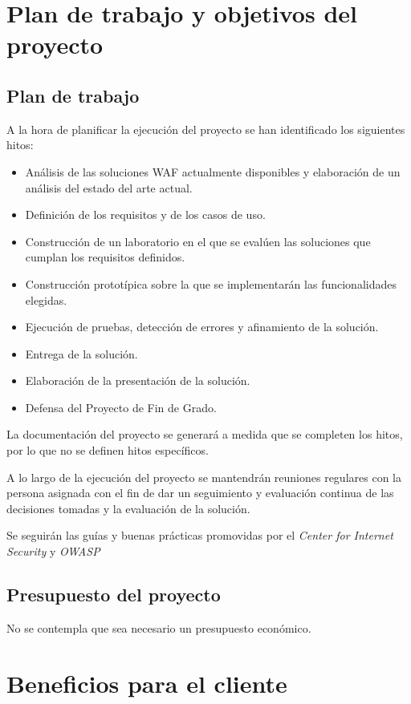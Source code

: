 \section{Plan de trabajo y objetivos del proyecto}
\subsection{Plan de trabajo}
\par A la hora de planificar la ejecución del proyecto se han identificado los siguientes hitos:
\begin{itemize}
  \item Análisis de las soluciones WAF actualmente disponibles y elaboración de un análisis del estado del arte actual.
  \item Definición de los requisitos y de los casos de uso.
  \item Construcción de un laboratorio en el que se evalúen las soluciones que cumplan los requisitos definidos.
  \item Construcción prototípica sobre la que se implementarán las funcionalidades elegidas.
  \item Ejecución de pruebas, detección de errores y afinamiento de la solución.
  \item Entrega de la solución.
  \item Elaboración de la presentación de la solución.
  \item Defensa del Proyecto de Fin de Grado.
\end{itemize}
\par La documentación del proyecto se generará a medida que se completen los hitos, por lo que no se definen hitos específicos.
\par A lo largo de la ejecución del proyecto se mantendrán reuniones regulares con la persona asignada con el fin de dar un seguimiento y evaluación continua de las decisiones tomadas y la evaluación de la solución.
\par Se seguirán las guías y buenas prácticas promovidas por el {\em Center for Internet Security} y {\em OWASP}

\subsection{Presupuesto del proyecto}
\par No se contempla que sea necesario un presupuesto económico.

\section{Beneficios para el cliente}

